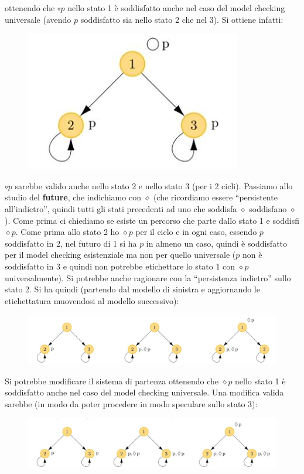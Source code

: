 \documentclass[a4paper,12pt, oneside]{book}
\begin{document}
ottenendo che $\circ p$ nello stato 1 è soddisfatto anche nel caso del model
checking universale (avendo $p$ soddisfatto sia nello stato 2 che nel 3). Si
ottiene infatti:  
\begin{figure}[H]
  \centering
  \includegraphics[scale = 0.32]{img/nl6.jpg} 
\end{figure}
$\circ p$ sarebbe valido anche nello stato 2 e nello stato 3 (per i 2 cicli).
\newpage
Passiamo allo studio del \textbf{future}, che indichiamo con $\diamond$ (che
ricordiamo essere ``persistente all'indietro'', quindi tutti gli stati
precedenti ad uno che soddisfa $\diamond$ soddisfano $\diamond$). Come
prima ci chiediamo se esiste un percorso che parte dallo stato 1 e soddisfi
$\diamond p$. Come prima allo stato 
2 ho $\diamond p$ per il ciclo e in ogni caso, essendo $p$ soddisfatto in 2, nel
futuro di 1 si ha $p$ in almeno un caso, quindi è soddisfatto per il model
checking esistenziale ma non per quello universale ($p$ non è soddisfatto in
3 e quindi non potrebbe etichettare lo stato 1 con $\diamond p$
universalmente).
Si potrebbe anche ragionare con la ``persistenza indietro'' sullo stato
2. Si ha quindi (partendo dal modello di sinistra e aggiornando le etichettatura
muovendosi al modello successivo):  
\begin{figure}[H]
  \centering
  \includegraphics[scale = 0.33]{img/nl8.jpg} 
\end{figure}
Si potrebbe modificare il sistema di partenza ottenendo che $\diamond p$ nello
stato 1 è soddisfatto anche nel caso del model checking universale. Una modifica
valida sarebbe (in modo da poter procedere in modo speculare sullo stato 3):
\begin{figure}[H]
  \centering
  \includegraphics[scale = 0.35]{img/nl9.jpg} 
\end{figure}
\end{document}
